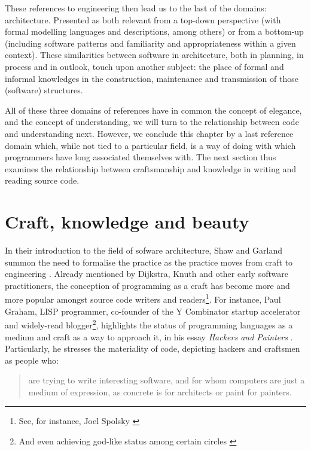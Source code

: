 These references to engineering then lead us to the last of the domains: architecture. Presented as both relevant from a top-down perspective (with formal modelling languages and descriptions, among others) or from a bottom-up (including software patterns and familiarity and appropriateness within a given context). These similarities between software in architecture, both in planning, in process and in outlook, touch upon another subject: the place of formal and informal knowledges in the construction, maintenance and transmission of those (software) structures.

All of these three domains of references have in common the concept of elegance, and the concept of understanding, we will turn to the relationship between code and understanding next. However, we conclude this chapter by a last reference domain which, while not tied to a particular field, is a way of doing with which programmers have long associated themselves with. The next section thus examines the relationship between craftsmanship and knowledge in writing and reading source code.

\pagebreak

\section{Craft, knowledge and beauty}
\label{sec:craft}

In their introduction to the field of sofware architecture, Shaw and Garland summon the need to formalise the practice as the practice moves from craft to engineering \citep{shaw_software_1996}. Already mentioned by Dijkstra, Knuth and other early software practitioners, the conception of programming as a craft has become more and more popular amongst source code writers and readers\footnote{See, for instance, Joel Spolsky \citep{spolosky_craftsmanship_2003,seibel_coders_2009}}.  For instance, Paul Graham, LISP programmer, co-founder of the Y Combinator startup accelerator and widely-read blogger\footnote{And even achieving god-like status among certain circles \citep{eadicicco_startup_2014}}, highlights the status of programming languages as a medium and craft as a way to approach it, in his essay \emph{Hackers and Painters} \citep{graham_hackers_2003}. Particularly, he stresses the materiality of code, depicting hackers and craftsmen as people who:

\begin{quote}
  are trying to write interesting software, and for whom computers are just a medium of expression, as concrete is for architects or paint for painters.
\end{quote}

